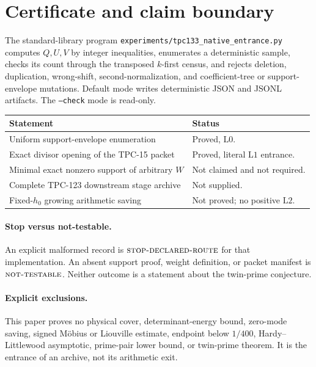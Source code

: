 \documentclass[11pt]{article}
\theoremstyle{definition}
\theoremstyle{remark}
\newcommand{\Lzero}{\mathrm{L0}}
\newcommand{\Lone}{\mathrm{L1}}
\newcommand{\Ltwo}{\mathrm{L2}}
\newcommand{\NT}{\textsc{not-testable}}
\newcommand{\STOP}{\textsc{stop-declared-route}}
\begin{document}
\section{Certificate and claim boundary}

The standard-library program
\texttt{experiments/tpc133\_native\_entrance.py} computes
\(Q,U,V\) by integer inequalities, enumerates a deterministic sample,
checks its count through the transposed \(k\)-first census, and rejects
deletion, duplication, wrong-shift, second-normalization, and
coefficient-tree or support-envelope mutations.  Default mode writes
deterministic JSON and JSONL artifacts.  The \texttt{--check} mode is
read-only.

\begin{center}
\small
\begin{tabularx}{\textwidth}{@{}P{0.42\textwidth}Y@{}}
\toprule
Statement & Status\\
\midrule
Uniform support-envelope enumeration
& Proved, \(\Lzero\).\\
Exact divisor opening of the TPC-15 packet
& Proved, literal \(\Lone\) entrance.\\
Minimal exact nonzero support of arbitrary \(W\)
& Not claimed and not required.\\
Complete TPC-123 downstream stage archive
& Not supplied.\\
Fixed-\(h_0\) growing arithmetic saving
& Not proved; no positive \(\Ltwo\).\\
\bottomrule
\end{tabularx}
\end{center}

\paragraph{Stop versus not-testable.}
An explicit malformed record is \(\STOP\) for that implementation.
An absent support proof, weight definition, or packet manifest is
\(\NT\).  Neither outcome is a statement about the twin-prime
conjecture.

\paragraph{Explicit exclusions.}
This paper proves no physical cover, determinant-energy bound,
zero-mode saving, signed M\"obius or Liouville estimate, endpoint
below \(1/400\), Hardy--Littlewood asymptotic, prime-pair lower bound,
or twin-prime theorem.  It is the entrance of an archive, not its
arithmetic exit.

\begingroup
\small
\setlength{\bibsep}{2pt plus 0.3ex}


\endgroup
\end{document}
